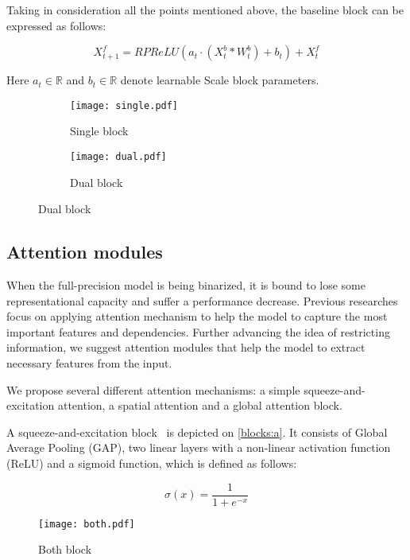 \documentclass{article}
\begin{document}
Taking in consideration all the points mentioned above, the baseline block can be expressed as follows:

\begin{equation}
    X_{t+1}^f = RPReLU(a_t \cdot (X_{t}^b \ast W_t^b) + b_t) + X_t^f
\end{equation}

Here $a_t \in \mathbb{R}$ and $b_t \in \mathbb{R}$ denote learnable Scale block parameters.

\begin{figure}[t]
\centering
\begin{subfigure}[b]{0.8\textwidth}
   \texttt{[image: single.pdf]}
   \caption{Single block}
   \label{block:e} 
\end{subfigure}

\begin{subfigure}[b]{0.8\textwidth}
   \texttt{[image: dual.pdf]}
   \caption{Dual block}
   \label{block:f} 
\end{subfigure}
\end{figure}

\subsection{Attention modules}
When the full-precision model is being binarized, it is bound to lose some representational capacity and suffer a performance decrease. Previous researches~\cite{guo2022join, xue2022ir2net} focus on applying attention mechanism to help the model to capture the most important features and dependencies. Further advancing the idea of restricting information, we suggest attention modules that help the model to extract necessary features from the input. 

We propose several different attention mechanisms: a simple squeeze-and-excitation attention, a spatial attention and a global attention block.

A squeeze-and-excitation block~\cite{hu2018squeeze} is depicted on \ref{blocks:a}. It consists of Global Average Pooling (GAP), two linear layers with a non-linear activation function (ReLU) and a sigmoid function, which is defined as follows:

\begin{equation*}
    \sigma(x) = \dfrac{1}{1 + e^{-x}}
\end{equation*}

\begin{figure}[t]
\texttt{[image: both.pdf]}
   \caption{Both block}
   \label{block:g} 
\end{figure}
\end{document}
